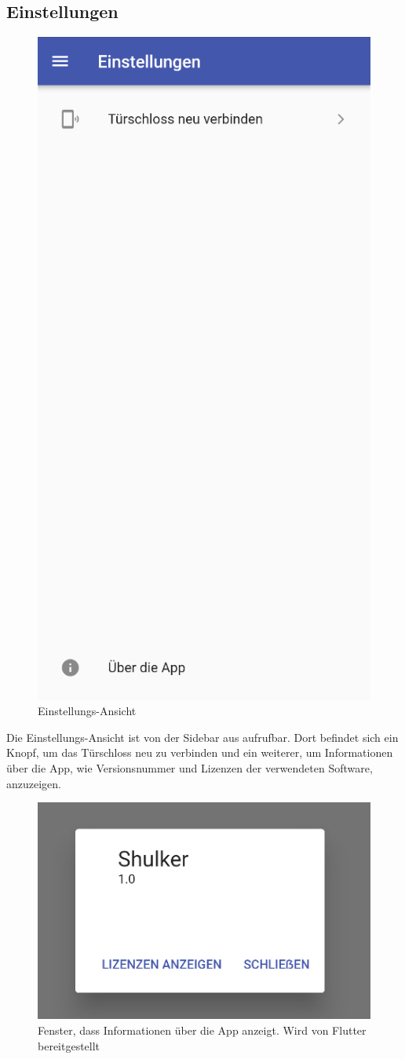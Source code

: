 \subsection{Einstellungen}
\begin{figure}[H]
    \begin{center}
        \includegraphics[width=.4\textwidth]{images/mobile/Settings.png}
        \caption{Einstellungs-Ansicht}
    \end{center}
\end{figure}

Die Einstellungs-Ansicht ist von der Sidebar aus aufrufbar. Dort befindet sich ein Knopf, um das Türschloss neu
zu verbinden und ein weiterer, um Informationen über die App, wie Versionsnummer und Lizenzen der verwendeten
Software, anzuzeigen.

\begin{figure}[H]
    \begin{center}
        \includegraphics[width=.4\textwidth]{images/mobile/AboutTheApp.png}
        \caption{Fenster, dass Informationen über die App anzeigt. Wird von Flutter bereitgestellt }
    \end{center}
\end{figure}

